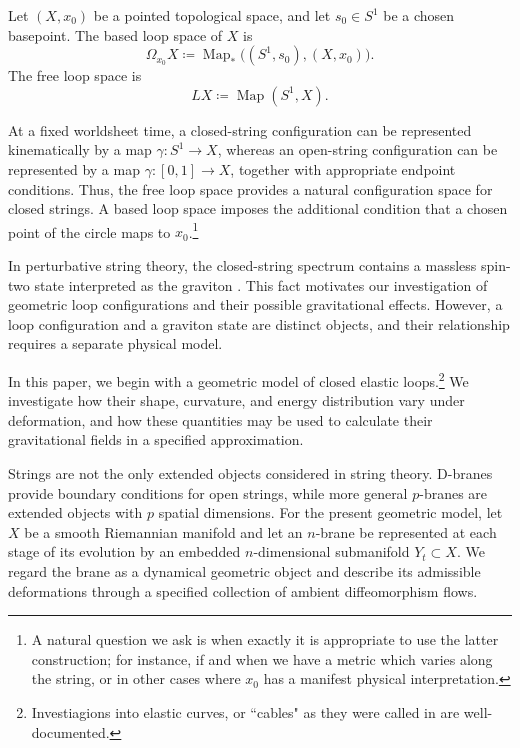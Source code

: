 \documentclass{article}
\numberwithin{tm}{section}
\numberwithin{dn}{section}
\numberwithin{as}{section}
\numberwithin{rk}{section}
\numberwithin{lem}{section}
\numberwithin{ax}{section}
\numberwithin{pp}{section}
\numberwithin{eg}{section}
\numberwithin{war}{section}
\numberwithin{equation}{section}
\numberwithin{prop}{section}
\numberwithin{nt}{section}
\numberwithin{rc}{section}
\begin{document}
Let $(X,x_0)$ be a pointed topological space, and let
$s_0\in S^1$ be a chosen basepoint. The based loop space
of $X$ is
\begin{equation}
	\Omega_{x_0}X
	\coloneq
	\operatorname{Map}_*
	\bigl((S^1,s_0),(X,x_0)\bigr).
\end{equation}
The free loop space is
\begin{equation}
	LX
	\coloneq
	\operatorname{Map}(S^1,X).
\end{equation}

At a fixed worldsheet time, a closed-string configuration
can be represented kinematically by a map
$\gamma:S^1\to X$, whereas an open-string configuration
can be represented by a map $\gamma:[0,1]\to X$,
together with appropriate endpoint conditions. Thus, the
free loop space provides a natural configuration space for
closed strings. A based loop space imposes the additional
condition that a chosen point of the circle maps to $x_0$.\footnote{A natural question we ask is when exactly it is appropriate to use the latter construction; for instance, if and when we have a metric which varies along the string, or in other cases where $x_0$ has a manifest physical interpretation.} 

In perturbative string theory, the closed-string spectrum
contains a massless spin-two state interpreted as the
graviton \cite{Green,Polchinski,Zwiebach}. This fact
motivates our investigation of geometric loop
configurations and their possible gravitational effects.
However, a loop configuration and a graviton state are
distinct objects, and their relationship requires a
separate physical model.

In this paper, we begin with a geometric model of closed
elastic loops.\footnote{Investiagions into elastic curves, or ``cables" as they were called in \cite{Atai} are well-documented.} We investigate how their shape, curvature,
and energy distribution vary under deformation, and how
these quantities may be used to calculate their
gravitational fields in a specified approximation.

Strings are not the only extended objects considered in
string theory. D-branes provide boundary conditions for
open strings, while more general $p$-branes are extended
objects with $p$ spatial dimensions. For the present geometric model, let $X$ be a smooth
Riemannian manifold and let an $n$-brane be represented
at each stage of its evolution by an embedded
$n$-dimensional submanifold $Y_t\subset X$. We regard
the brane as a dynamical geometric object and describe
its admissible deformations through a specified
collection of ambient diffeomorphism flows.
\end{document}

